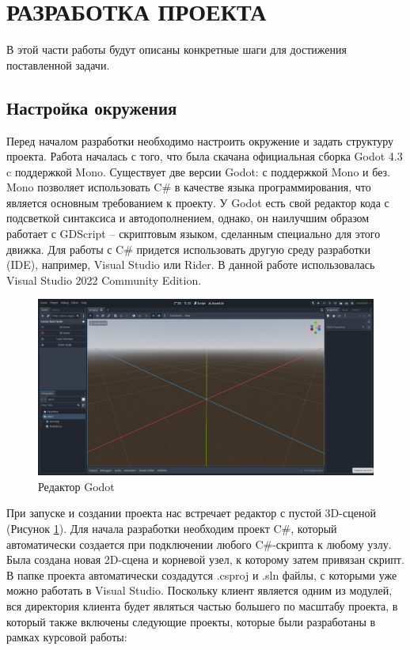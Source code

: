 \section{РАЗРАБОТКА ПРОЕКТА}

        В этой части работы будут описаны конкретные шаги для достижения поставленной задачи.

    \subsection{Настройка окружения}

        Перед началом разработки необходимо настроить окружение и задать структуру проекта. Работа началась с того, что была скачана официальная сборка Godot 4.3 c поддержкой Mono. 
        Существует две версии Godot: с поддержкой Mono и без. Mono позволяет использовать C\# в качестве языка программирования, что является основным требованием к проекту.
        У Godot есть свой редактор кода с подсветкой синтаксиса и автодополнением, однако, он наилучшим образом работает с GDScript -- скриптовым языком, сделанным специально для этого
        движка. Для работы с C\# придется использовать другую среду разработки (IDE), например, Visual Studio или Rider. В данной работе использовалась Visual Studio 2022 Community Edition.
        \begin{figure}[H]
            \centering
            \includegraphics[width=\textwidth]{pictures/godot-editor.png}
            \caption{Редактор Godot}\label{ris2.1}
        \end{figure}
        При запуске и создании проекта нас встречает редактор с пустой 3D-сценой (Рисунок \ref{ris2.1}). Для начала разработки необходим проект C\#, который автоматически создается при
        подключении любого C\#-скрипта к любому узлу. Была создана новая 2D-сцена и корневой узел, к которому затем привязан скрипт. В папке проекта автоматически создадутся .csproj и .sln файлы, с
        которыми уже можно работать в Visual Studio. Поскольку клиент является одним из модулей, вся директория клиента будет являться частью большего по масштабу проекта, в который
        также включены следующие проекты, которые были разработаны в рамках курсовой работы:

